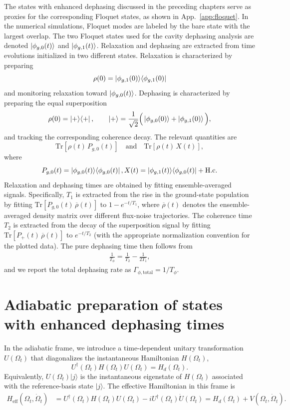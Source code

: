 \begin{appendices}
The states with enhanced dephasing discussed in the preceding chapters serve as proxies for the corresponding Floquet states, as shown in App.~\ref{app:floquet}. In the numerical simulations, Floquet modes are labeled by the bare state with the largest overlap. The two Floquet states used for the cavity dephasing analysis are denoted $\ket{\phi_{g,0}(t)}$ and $\ket{\phi_{g,1}(t)}$. Relaxation and dephasing are extracted from time evolutions initialized in two different states. Relaxation is characterized by preparing
\[
\rho(0)=\ket{\phi_{g,1}(0)}\!\bra{\phi_{g,1}(0)}
\]
and monitoring relaxation toward \(\ket{\phi_{g,0}(t)}\). Dephasing is characterized by preparing the equal superposition
\[
\rho(0)=\ket{+}\!\bra{+}, \qquad \ket{+}=\frac{1}{\sqrt{2}}\Big(\ket{\phi_{g,0}(0)}+\ket{\phi_{g,1}(0)}\Big),
\]
and tracking the corresponding coherence decay. The relevant quantities are
\[
\mathrm{Tr}\!\left[\rho(t)\,P_{g,0}(t)\right] \quad \text{and} \quad \mathrm{Tr}\!\left[\rho(t)\,X(t)\right],
\]
where
\[
P_{g,0}(t)=\ket{\phi_{g,0}(t)}\!\bra{\phi_{g,0}(t)}, X(t)=\ket{\phi_{g,1}(t)}\!\bra{\phi_{g,0}(t)}+\mathrm{H.c.}
\]
Relaxation and dephasing times are obtained by fitting ensemble-averaged signals. Specifically, $T_1$ is extracted from the rise in the ground-state population by fitting $\mathrm{Tr}\!\left[P_{g,0}(t)\,\overline{\rho}(t)\right]$ to $1-e^{-t/T_1}$, where $\overline{\rho}(t)$ denotes the ensemble-averaged density matrix over different flux-noise trajectories. The coherence time $T_2$ is extracted from the decay of the superposition signal by fitting $\mathrm{Tr}\!\left[P_{+}(t)\,\overline{\rho}(t)\right]$ to $e^{-t/T_2}$ (with the appropriate normalization convention for the plotted data). The pure dephasing time then follows from
\begin{align}
\frac{1}{T_\phi}=\frac{1}{T_2}-\frac{1}{2T_1},
\end{align}
and we report the total dephasing rate as $\Gamma_{\phi,\mathrm{total}}=1/T_\phi$.

\chapter{Adiabatic preparation of states with enhanced dephasing times}
\label{app:adiabatic-prep}

In the adiabatic frame, we introduce a time-dependent unitary transformation $U(\Omega_t)$ that diagonalizes the instantaneous Hamiltonian $H(\Omega_t)$,
\begin{equation}
U^\dagger(\Omega_t) H(\Omega_t) U(\Omega_t)
=
H_d(\Omega_t).
\end{equation}
Equivalently, $U(\Omega_t)|j\rangle$ is the instantaneous eigenstate of $H(\Omega_t)$ associated with the reference-basis state $|j\rangle$. The effective Hamiltonian in this frame is
\begin{equation}
\begin{aligned}
H_{\mathrm{eff}}(\Omega_t,\dot{\Omega}_t)
&=
U^\dagger(\Omega_t) H(\Omega_t) U(\Omega_t)
-i U^\dagger(\Omega_t) \dot U(\Omega_t) =
H_d(\Omega_t)+V(\Omega_t,\dot{\Omega}_t).
\end{aligned}
\end{equation}


\end{appendices}
